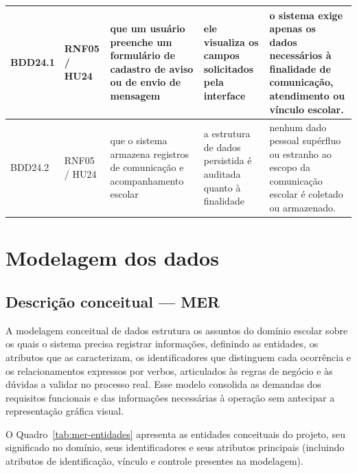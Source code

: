 \documentclass[a4paper,12pt]{report}
\begin{document}
\begin{longtable}{|p{1.6cm}|p{1.6cm}|p{3.6cm}|p{3.6cm}|p{4.0cm}|}
\hline
BDD24.1 & RNF05 / HU24 & que um usuário preenche um formulário de cadastro de aviso ou de envio de mensagem & ele visualiza os campos solicitados pela interface & o sistema exige apenas os dados necessários à finalidade de comunicação, atendimento ou vínculo escolar. \\
\hline
BDD24.2 & RNF05 / HU24 & que o sistema armazena registros de comunicação e acompanhamento escolar & a estrutura de dados persistida é auditada quanto à finalidade & nenhum dado pessoal supérfluo ou estranho ao escopo da comunicação escolar é coletado ou armazenado. \\
\hline
\end{longtable}

\chapter{Modelagem dos dados}

\section{Descrição conceitual — MER}

A modelagem conceitual de dados estrutura os assuntos do domínio escolar sobre os quais o sistema precisa registrar informações, definindo as entidades, os atributos que as caracterizam, os identificadores que distinguem cada ocorrência e os relacionamentos expressos por verbos, articulados às regras de negócio e às dúvidas a validar no processo real. Esse modelo consolida as demandas dos requisitos funcionais e das informações necessárias à operação sem antecipar a representação gráfica visual.

O Quadro~\ref{tab:mer-entidades} apresenta as entidades conceituais do projeto, seu significado no domínio, seus identificadores e seus atributos principais (incluindo atributos de identificação, vínculo e controle presentes na modelagem).
\end{document}
